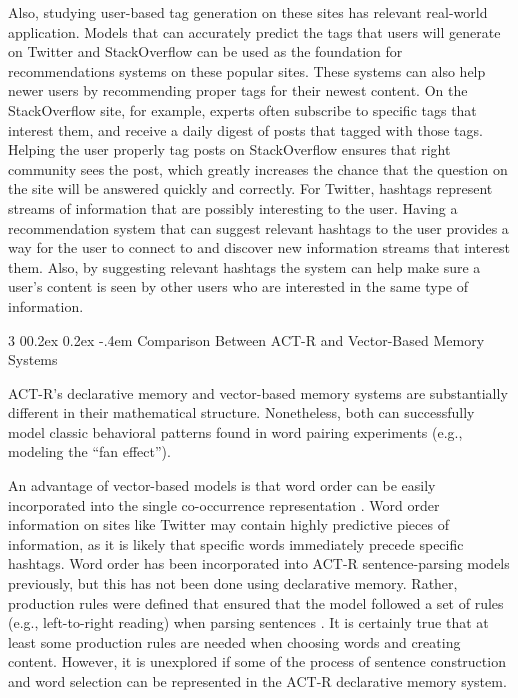 \documentclass[man,floatsintext,donotrepeattitle]{apa6}
\makeatletter
\renewcommand{\subsubsection}{%
  \@startsection
  {subsubsection}%
  {3}%
  {\parindent}%
  {0\baselineskip \@plus 0.2ex \@minus 0.2ex}%
  {-.4em}%
  {\normalfont\normalsize\bfseries\addperi}}
\makeatother
\begin{document}
Also, studying user-based tag generation on these sites has relevant real-world application.
Models that can accurately predict the tags that users will generate on Twitter and StackOverflow can be used as the foundation for recommendations systems on these popular sites.
These systems can also help newer users by recommending proper tags for their newest content.
On the StackOverflow site, for example, experts often subscribe to specific tags that interest them, and receive a daily digest of posts that tagged with those tags.
Helping the user properly tag posts on StackOverflow ensures that right community sees the post, which greatly increases the chance that the question on the site will be answered quickly and correctly.
For Twitter, hashtags represent streams of information that are possibly interesting to the user.
Having a recommendation system that can suggest relevant hashtags to the user provides a way for the user to connect to and discover new information streams that interest them.
Also, by suggesting relevant hashtags the system can help make sure a user's content is seen by other users who are interested in the same type of information.

\subsubsection{Comparison Between ACT-R and Vector-Based Memory Systems}

ACT-R's declarative memory and vector-based memory systems are substantially different in their mathematical structure.
Nonetheless, both can successfully model classic behavioral patterns found in word pairing experiments (e.g., \cite{Rutledge2008} modeling the ``fan effect'').

An advantage of vector-based models is that word order can be easily incorporated into the single co-occurrence representation \parencite{Jones2007}.
Word order information on sites like Twitter may contain highly predictive pieces of information, as it is likely that specific words immediately precede specific hashtags.
Word order has been incorporated into ACT-R sentence-parsing models previously, but this has not been done using declarative memory.
Rather, production rules were defined that ensured that the model followed a set of rules (e.g., left-to-right reading) when parsing sentences \parencite{Lewis2006}.
It is certainly true that at least some production rules are needed when choosing words and creating content. 
However, it is unexplored if some of the process of sentence construction and word selection can be represented in the ACT-R declarative memory system.
\end{document}
